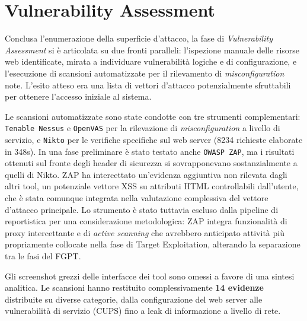 \documentclass[11pt]{report}
\begin{document}
	\section{Vulnerability Assessment}
	Conclusa l'enumerazione della superficie d'attacco, la fase di \textit{Vulnerability Assessment} si è articolata su due fronti paralleli: l'ispezione manuale delle risorse web identificate, mirata a individuare vulnerabilità logiche e di configurazione, e l'esecuzione di scansioni automatizzate per il rilevamento di \textit{misconfiguration} note. L'esito atteso era una lista di vettori d'attacco potenzialmente sfruttabili per ottenere l'accesso iniziale al sistema.
	
	Le scansioni automatizzate sono state condotte con tre strumenti complementari: \texttt{Tenable Nessus} e \texttt{OpenVAS} per la rilevazione di \textit{misconfiguration} a livello di servizio, e \texttt{Nikto} per le verifiche specifiche sul web server (8234 richieste elaborate in 348s). In una fase preliminare è stato testato anche \texttt{OWASP ZAP}, ma i risultati ottenuti sul fronte degli header di sicurezza si sovrapponevano sostanzialmente a quelli di Nikto. ZAP ha intercettato un'evidenza aggiuntiva non rilevata dagli altri tool, un potenziale vettore XSS su attributi HTML controllabili dall'utente, che è stata comunque integrata nella valutazione complessiva del vettore d'attacco principale. Lo strumento è stato tuttavia escluso dalla pipeline di reportistica per una considerazione metodologica: ZAP integra funzionalità di proxy intercettante e di \textit{active scanning} che avrebbero anticipato attività più propriamente collocate nella fase di Target Exploitation, alterando la separazione tra le fasi del FGPT.
	
	Gli screenshot grezzi delle interfacce dei tool sono omessi a favore di una sintesi analitica. Le scansioni hanno restituito complessivamente \textbf{14 evidenze} distribuite su diverse categorie, dalla configurazione del web server alle vulnerabilità di servizio (CUPS) fino a leak di informazione a livello di rete.
	
\end{document}
